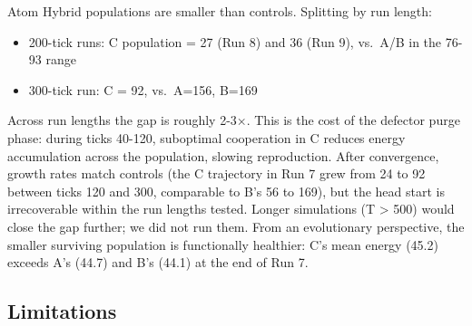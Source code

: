 \documentclass[
  11pt,
  letterpaper,
]{article}
\providecommand{\tightlist}{%
  \setlength{\itemsep}{0pt}\setlength{\parskip}{0pt}}
\begin{document}
Atom Hybrid populations are smaller than controls. Splitting by run
length:

\begin{itemize}
\tightlist
\item
  200-tick runs: C population = 27 (Run 8) and 36 (Run 9), vs.~A/B in
  the 76-93 range
\item
  300-tick run: C = 92, vs.~A=156, B=169
\end{itemize}

Across run lengths the gap is roughly 2-3×. This is the cost of the
defector purge phase: during ticks 40-120, suboptimal cooperation in C
reduces energy accumulation across the population, slowing reproduction.
After convergence, growth rates match controls (the C trajectory in Run
7 grew from 24 to 92 between ticks 120 and 300, comparable to B's 56 to
169), but the head start is irrecoverable within the run lengths tested.
Longer simulations (T \textgreater{} 500) would close the gap further;
we did not run them. From an evolutionary perspective, the smaller
surviving population is functionally healthier: C's mean energy (45.2)
exceeds A's (44.7) and B's (44.1) at the end of Run 7.

\subsection{Limitations}\label{limitations}
\end{document}
